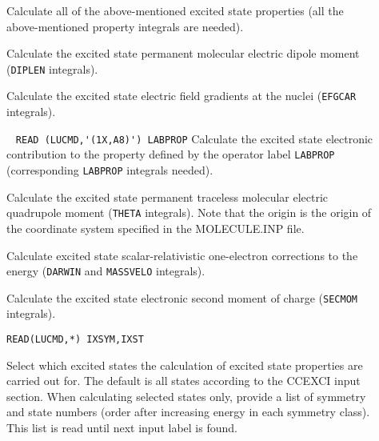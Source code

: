 \begin{description}
\item[]
        Calculate all of the above-mentioned excited state properties (all the
        above-mentioned property integrals are needed).
%
\item[]
        Calculate the excited state permanent molecular electric dipole moment
        (\verb+DIPLEN+ integrals).
%
\item[]
        Calculate the excited state electric field gradients at the nuclei
        (\verb+EFGCAR+ integrals).
%
\item[] \verb| |\newline
\verb|READ (LUCMD,'(1X,A8)') LABPROP|\newline
        Calculate the excited state electronic contribution to the property defined
        by the operator label \verb+LABPROP+ (corresponding
        \verb+LABPROP+ integrals needed).

\item[]
        Calculate the excited state permanent traceless molecular electric
        quadrupole moment (\verb+THETA+ integrals). Note that the
        origin is the origin of the coordinate system specified
        in the MOLECULE.INP file.
%
\item[]
        Calculate excited state scalar-relativistic one-electron
        corrections to the 
        energy (\verb+DARWIN+ and \verb+MASSVELO+ integrals).
%
\item[]
        Calculate the excited state electronic second moment of charge
        (\verb+SECMOM+ integrals).
%

\item[] 

\noindent\verb|READ(LUCMD,*) IXSYM,IXST|

Select which excited states the calculation of excited state properties 
are carried out for. The default is all states according to the CCEXCI input section.
When calculating selected states only,
provide a list of symmetry and state numbers (order after increasing energy in
each symmetry class).
This list is read until next input label is found.



\end{description}

